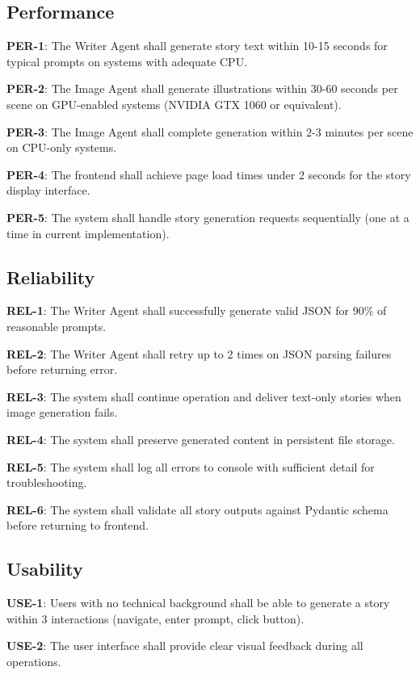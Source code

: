 \subsection{Performance}

\textbf{PER-1}: The Writer Agent shall generate story text within 10-15 seconds for typical prompts on systems with adequate CPU.

\textbf{PER-2}: The Image Agent shall generate illustrations within 30-60 seconds per scene on GPU-enabled systems (NVIDIA GTX 1060 or equivalent).

\textbf{PER-3}: The Image Agent shall complete generation within 2-3 minutes per scene on CPU-only systems.

\textbf{PER-4}: The frontend shall achieve page load times under 2 seconds for the story display interface.

\textbf{PER-5}: The system shall handle story generation requests sequentially (one at a time in current implementation).

\subsection{Reliability}

\textbf{REL-1}: The Writer Agent shall successfully generate valid JSON for 90\% of reasonable prompts.

\textbf{REL-2}: The Writer Agent shall retry up to 2 times on JSON parsing failures before returning error.

\textbf{REL-3}: The system shall continue operation and deliver text-only stories when image generation fails.

\textbf{REL-4}: The system shall preserve generated content in persistent file storage.

\textbf{REL-5}: The system shall log all errors to console with sufficient detail for troubleshooting.

\textbf{REL-6}: The system shall validate all story outputs against Pydantic schema before returning to frontend.

\subsection{Usability}

\textbf{USE-1}: Users with no technical background shall be able to generate a story within 3 interactions (navigate, enter prompt, click button).

\textbf{USE-2}: The user interface shall provide clear visual feedback during all operations.

